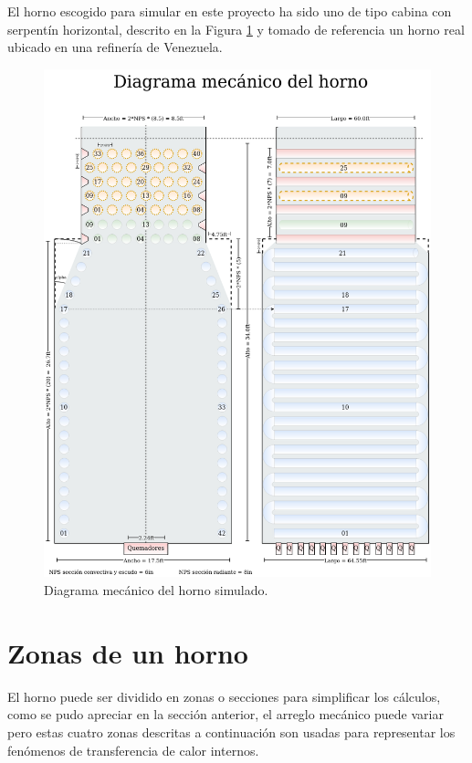 \par El horno escogido para simular en este proyecto ha sido uno de tipo cabina con serpentín horizontal, descrito en la Figura \ref{fig:diagrama-meca} y tomado de referencia un horno real ubicado en una refinería de Venezuela.

\begin{figure}[hbt]
\begin{center}
\includegraphics[scale=0.38]{images/diagrama-meca}
\caption[Diagrama mecánico]{Diagrama mecánico del horno simulado.}
\label{fig:diagrama-meca}
\end{center}
\end{figure}

\section{Zonas de un horno}

\par El horno puede ser dividido en zonas o secciones para simplificar los cálculos, como se pudo apreciar en la sección anterior, el arreglo mecánico puede variar pero estas cuatro zonas descritas a continuación son usadas para representar los fenómenos de transferencia de calor internos.

